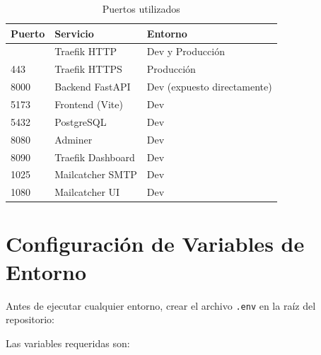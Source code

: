 \begin{longtable}[]{@{}lll@{}}
\caption[Puertos utilizados]{Puertos utilizados}\tabularnewline
\toprule\noalign{}
Puerto & Servicio & Entorno \\
\midrule\noalign{}
\endhead
\bottomrule\noalign{}
\endlastfoot
80 & Traefik HTTP & Dev y Producción \\
443 & Traefik HTTPS & Producción \\
8000 & Backend FastAPI & Dev (expuesto directamente) \\
5173 & Frontend (Vite) & Dev \\
5432 & PostgreSQL & Dev \\
8080 & Adminer & Dev \\
8090 & Traefik Dashboard & Dev \\
1025 & Mailcatcher SMTP & Dev \\
1080 & Mailcatcher UI & Dev \\
\end{longtable}

\section{Configuración de Variables de Entorno}\label{configuraciuxf3n-de-variables-de-entorno}

Antes de ejecutar cualquier entorno, crear el archivo \texttt{.env} en la raíz del repositorio:

\begin{Shaded}
\begin{Highlighting}[]
\end{Highlighting}
\end{Shaded}

Las variables requeridas son:

